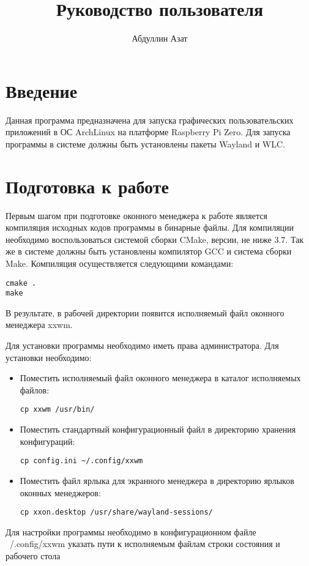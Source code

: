 \documentclass[10pt,a4paper]{report}
\author{Абдуллин Азат}
\title{Руководство пользователя}
\begin{document}
\maketitle
\renewcommand{\thesection}{\arabic{section}}
\section{Введение}
Данная программа предназначена для запуска графических пользовательских приложений 	в ОС ArchLinux на платформе Raspberry Pi Zero. Для запуска программы в системе должны быть установлены пакеты Wayland и WLC.
	
\section{Подготовка к работе}
Первым шагом при подготовке оконного менеджера к работе является компиляция исходных кодов программы в бинарные файлы. Для компиляции необходимо воспользоваться системой сборки CMake, версии, не ниже 3.7. Так же в системе должны быть установлены компилятор GCC и система сборки Make.
Компиляция осуществляется следующими командами:
\begin{verbatim}
cmake .
make
\end{verbatim}
В результате, в рабочей директории появится исполняемый файл оконного менеджера xxwm.
					
Для установки программы необходимо иметь права администратора. Для установки необходимо:
\begin{itemize}
\item Поместить исполняемый файл оконного менеджера в каталог исполняемых файлов:
\begin{verbatim}
cp xxwm /usr/bin/
\end{verbatim}
\item Поместить стандартный конфигурационный файл в директорию хранения конфигураций:
\begin{verbatim}
cp config.ini ~/.config/xxwm
\end{verbatim}
\item Поместить файл ярлыка для экранного менеджера в директорию ярлыков оконных менеджеров:
\begin{verbatim}
cp xxon.desktop /usr/share/wayland-sessions/
\end{verbatim}
\end{itemize}
Для настройки программы необходимо в конфигурационном файле ~/.config/xxwm указать пути к исполняемым файлам строки состояния и рабочего стола
\end{document}

